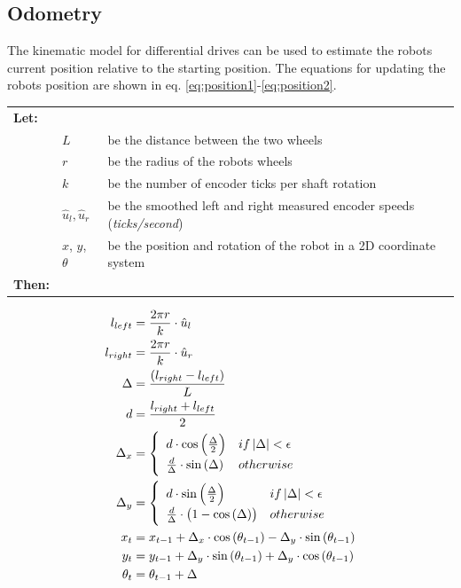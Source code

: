 \documentclass[11pt]{article}
\begin{document}
\subsection{Odometry}
The kinematic model for differential drives can be used to estimate the robots current position relative to the starting position. The equations for updating the robots position are shown in eq. \ref{eq:position1}-\vref*{eq:position2}. \par
{\footnotesize
  \begin{tabular}{l l l}
    \textbf{Let:} \\
 &$L$ &be the distance between the two wheels \\
 &$r$ &be the radius of the robots wheels \\
 &$k$ &be the number of encoder ticks per shaft rotation\\
 &$\hat{u}_l, \hat{u}_r$ &be the smoothed left and right measured encoder speeds (\emph{ticks/second})\\
&$x$, $y$, $\theta$ &be the position and rotation of the robot in a 2D coordinate system\\
    \textbf{Then:}
  \end{tabular}
  \begin{align}
    l_{left} &= \frac{2\pi r}{k} \cdot \hat{u}_l\label{eq:position1}\\
    l_{right} &= \frac{2\pi r}{k} \cdot \hat{u}_r\\
    \Delta &= \frac{(l_{right} - l_{left})}{L}\\
    d &= \frac{l_{right} + l_{left}}{2}\\
    \Delta_x &= \begin{cases}
                    \hspace{5pt}d \cdot \cos\left(\frac{\Delta}{2}\right) & if \left|\Delta\right| < \epsilon\\
                    \hspace{5pt}\frac{d}{\Delta} \cdot \sin\left(\Delta\right) & otherwise
                  \end{cases} \vspace{5pt}  \\
    \Delta_y &= \begin{cases}
                    \hspace{5pt}d \cdot \sin\left(\frac{\Delta}{2}\right) & if \left|\Delta\right| < \epsilon\\
                    \hspace{5pt}\frac{d}{\Delta} \cdot \left(1-\cos\left(\Delta\right)\right) & otherwise
                  \end{cases} \vspace{5pt}\\
    x_t &= x_{t-1} + \Delta_x \cdot \cos\left(\theta_{t-1}\right) - \Delta_y \cdot \sin\left(\theta_{t-1}\right)\\
    y_t &= y_{t-1} + \Delta_y \cdot \sin\left(\theta_{t-1}\right) + \Delta_y \cdot \cos\left(\theta_{t-1}\right)\\
    \theta_t &= \theta_{t-1} + \Delta\hspace{10pt}\label{eq:position2}
  \end{align}}
\end{document}
